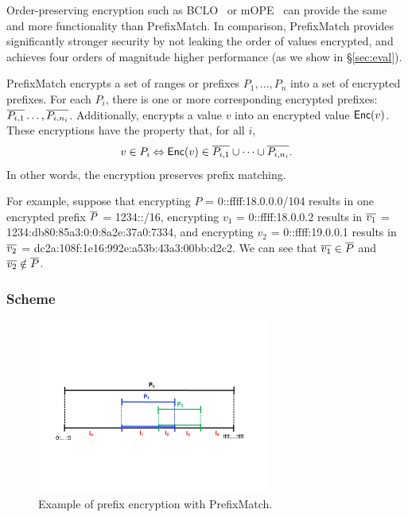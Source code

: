  Order-preserving encryption such as BCLO~\cite{boldyreva:ope} or mOPE~\cite{popa:mope} can provide the same and more functionality than PrefixMatch. In comparison, PrefixMatch provides significantly stronger security by not leaking the order of values encrypted, and achieves four orders of magnitude higher performance  (as we show in \S\ref{sec:eval}).






PrefixMatch encrypts a set of ranges or prefixes $P_1, \dots, P_n$ into a set of encrypted prefixes. For each $P_i$, there is one or more corresponding encrypted prefixes: $\overline{P_{i,1}} \dots, \overline{P_{i, n_i}}$.  Additionally, \pmatch{} encrypts a value $v$ into an encrypted value $\mathsf{Enc}(v)$. These encryptions have the  property that, for all $i$,  
%
\[  v \in P_i  \Leftrightarrow \mathsf{Enc}(v) \in \overline{P_{i, 1}} \cup \dots \cup \overline{P_{i, n_i}}. \]
%
In other words, the encryption preserves prefix matching.



For example, suppose that encrypting $P$ =  0::ffff:18.0.0.0/104 results in one encrypted prefix $\overline{P}$ = 1234::/16, encrypting $v_1$ = 0::ffff:18.0.0.2 results in  
 $\overline{v_1}$ = 1234:db80:85a3:0:0:8a2e:37a0:7334, and encrypting $v_2$ = 0::ffff:19.0.0.1 results in 
$\overline{v_2}$ = dc2a:108f:1e16:992e:a53b:43a3:00bb:d2c2. We can see that $\overline{v_1} \in \overline{P}$ and $\overline{v_2} \notin \overline{P}$. 




\subsubsection{Scheme} 
\label{sec:rmscheme}

\begin{figure}[t]
  \centering
  \includegraphics[width=3in]{fig/rangeopts3.pdf}
  \caption[]{Example of prefix encryption with PrefixMatch.\label{fig:rangeopts3}}
\end{figure}

